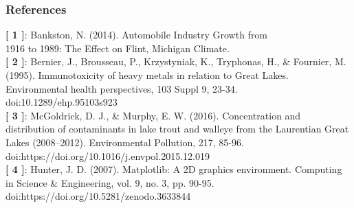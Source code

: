 \documentclass[10pt]{beamer}
\begin{document}
\begin{frame}
  \frametitle{References} %
    \textbf{[ 1 ]}: Bankston, N. (2014). Automobile Industry Growth from \\ 1916 to 1989: The Effect on Flint, Michigan Climate. \\ \vspace{2.5mm}
    \textbf{[ 2 ]}: Bernier, J., Brousseau, P., Krzystyniak, K., Tryphonas, H., \& Fournier, M. (1995). Immunotoxicity of heavy metals in relation to Great Lakes. Environmental health perspectives, 103 Suppl 9, 23-34. doi:10.1289/ehp.95103s923 \\ \vspace{2.5mm}
    \textbf{[ 3 ]}: McGoldrick, D. J., \& Murphy, E. W. (2016). Concentration and distribution of contaminants in lake trout and walleye from the Laurentian Great Lakes (2008–2012). Environmental Pollution, 217, 85-96. doi:https://doi.org/10.1016/j.envpol.2015.12.019 \\ \vspace{2.5mm}
    \textbf{[ 4 ]}: Hunter, J. D. (2007). Matplotlib: A 2D graphics environment. Computing in Science \& Engineering, vol. 9, no. 3, pp. 90-95. doi:https://doi.org/10.5281/zenodo.3633844
\end{frame}
\end{document}
